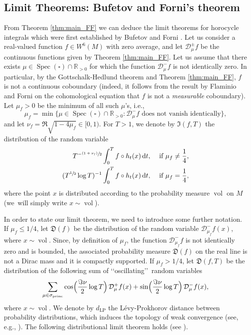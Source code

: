 \documentclass[11pt]{article}
\newcommand{\ie}{i.e.,\xspace}
\newcommand{\psfrac}[2]{\sfrac{(#1)}{#2}}
\newcommand \R{\mathbb{R}}
\newcommand*{\diff}{\mathop{}\!\mathrm{d}}
\newcommand{\Dp}[1]{\mathcal{D}_\mu^{+} #1}
\newcommand{\Dm}[1]{\mathcal{D}_\mu^{-} #1}
\newcommand{\Dpm}[1]{\mathcal{D}_\mu^{\pm} #1}
\newcommand{\Levy}{d_{\levyy}}
\DeclareMathOperator{\vol}{vol}
\DeclareMathOperator{\Spec}{Spec}
\DeclareMathOperator{\princ}{princ}
\DeclareMathOperator{\levyy}{LP}
\theoremstyle{definition}
\begin{document}
\subsection{Limit Theorems: Bufetov and Forni's theorem}

From Theorem \ref{thm:main_FF} we can deduce the limit theorems for horocycle integrals which were first established by Bufetov and Forni \cite{BuFo}.
Let us consider a real-valued function $f \in W^6(M)$ with zero average, and let $\Dpm{f}$ be the continuous functions given by Theorem \ref{thm:main_FF}.
Let us assume that there exists $\mu \in \Spec(\square) \cap \R_{>0}$ for which the function $\Dm{f}$ is not identically zero. In particular, by the Gottschalk-Hedlund theorem and Theorem \ref{thm:main_FF}, $f$ is not a continuous coboundary (indeed, it follows from the result by Flaminio and Forni \cite{FlaFo} on the cohomological equation that $f$ is not a \emph{measurable} coboundary).
Let $\mu_f >0$ be the minimum of all such $\mu$'s, \ie
\[
\mu_f = \min \{ \mu \in \Spec(\square) \cap \R_{>0} : \Dm{f} \text{ does not vanish identically}\},
\]
and let $\nu_f = \Re \sqrt{1-4\mu_f} \in [0,1)$.
For $T >1$, we denote by $\mathfrak{I}(f,T)$ the distribution of the random variable
\begin{equation*}
\begin{split}
T^{- \psfrac{1+\nu_f}{2}}\int_0^T f \circ h_t (x) \diff t, &\quad \text{ if } \mu_f \neq \frac{1}{4},\\
(T^{\sfrac{1}{2}} \log T)^{-1} \int_0^T f \circ h_t (x) \diff t, &\quad \text{ if } \mu_f = \frac{1}{4},
\end{split}
\end{equation*}
where the point $x$ is distributed according to the probability measure $\vol$ on $M$ (we~will simply write $x \sim \vol$).

In order to state our limit theorem, we need to introduce some further notation.
If $\mu_f \leq 1/4$, let $\mathfrak{D}(f)$ be the distribution of the random variable $\mathcal{D}^{-}_{\mu_f}f(x)$, where $x \sim \vol$.
Since, by definition of $\mu_f$, the function $\mathcal{D}^{-}_{\mu_f}f$ is not identically zero and is bounded, the associated probability measure $\mathfrak{D}(f)$ on the real line is not a Dirac mass and it is compactly supported.
If $\mu_f > 1/4$, let $\mathfrak{D}(f,T)$ be the distribution of the following sum of \lq\lq oscillating\rq\rq\ random variables
\[
\sum_{\mu \in \sigma_{\princ}} \cos\Bigl(\frac{\Im\nu}{2} \log T \Bigr) \, \Dp{ f(x)} + \sin\Bigl(\frac{\Im\nu}{2} \log T \Bigr) \, \Dm{ f(x)},
\]
where $x \sim \vol$. We denote by $\Levy$ the Lévy-Prokhorov distance between probability distributions, which induces the topology of weak convergence (see, e.g., \cite{Bil}).
The following distributional limit theorem holds (see \cite[Th.\,1.4, 1.5]{BuFo}).
\end{document}
